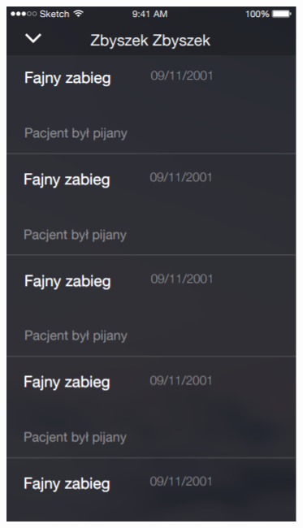 \begin{itemize}
\vspace{0,5cm}
\begin{center}\includegraphics{obraz2/5.png}\end{center}
\vspace{0,5cm}






\end{itemize}
